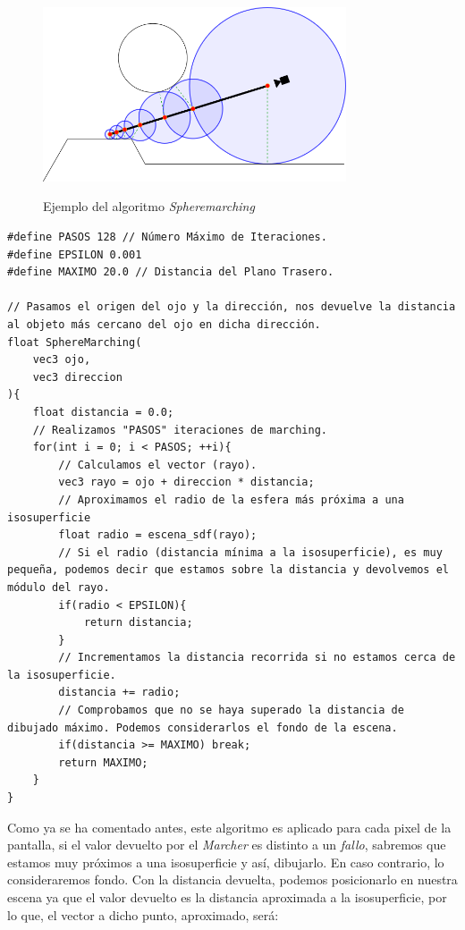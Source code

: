 \begin{figure}[H]
  \centering
  \captionsetup{justification=centering}%
  \includegraphics[width=0.8\textwidth]{secciones/imagenes/raymarching.png}\label{fig:spheremarcher}
  \caption{Ejemplo del algoritmo \textit{Spheremarching}}
\end{figure}
\newpage
\begin{lstlisting}
#define PASOS 128 // Número Máximo de Iteraciones.
#define EPSILON 0.001
#define MAXIMO 20.0 // Distancia del Plano Trasero.

// Pasamos el origen del ojo y la dirección, nos devuelve la distancia al objeto más cercano del ojo en dicha dirección.
float SphereMarching(
    vec3 ojo, 
    vec3 direccion
){
    float distancia = 0.0;
    // Realizamos "PASOS" iteraciones de marching.
    for(int i = 0; i < PASOS; ++i){
        // Calculamos el vector (rayo).
        vec3 rayo = ojo + direccion * distancia;
        // Aproximamos el radio de la esfera más próxima a una isosuperficie
        float radio = escena_sdf(rayo);
        // Si el radio (distancia mínima a la isosuperficie), es muy pequeña, podemos decir que estamos sobre la distancia y devolvemos el módulo del rayo.
        if(radio < EPSILON){
            return distancia;
        }
        // Incrementamos la distancia recorrida si no estamos cerca de la isosuperficie.
        distancia += radio;
        // Comprobamos que no se haya superado la distancia de dibujado máximo. Podemos considerarlos el fondo de la escena.
        if(distancia >= MAXIMO) break;
        return MAXIMO;
    }
}
\end{lstlisting}
\newpage
Como ya se ha comentado antes, este algoritmo es aplicado para cada pixel de la pantalla, si el valor devuelto por el \textit{Marcher} es distinto a un \textit{fallo}, sabremos que estamos muy próximos a una isosuperficie y así, dibujarlo. En caso contrario, lo consideraremos fondo. Con la distancia devuelta, podemos posicionarlo en nuestra escena ya que el valor devuelto es la distancia aproximada a la isosuperficie, por lo que, el vector a dicho punto, aproximado, será:
